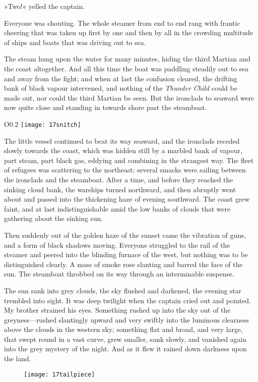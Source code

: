 »Two!« yelled the captain.

Everyone was shouting. The whole steamer from end to end rang with frantic cheering that was taken up first by one and then by all in the crowding multitude of ships and boats that was driving out to sea.

The steam hung upon the water for many minutes, hiding the third Martian and the coast altogether. And all this time the boat was paddling steadily out to sea and away from the fight; and when at last the confusion cleared, the drifting bank of black vapour intervened, and nothing of the \textit{Thunder Child} could be made out, nor could the third Martian be seen. But the ironclads to seaward were now quite close and standing in towards shore past the steamboat.

\begin{wrapfigure}{O}{0.2\textwidth}
\centering
\texttt{[image: 17snitch]}
\end{wrapfigure}

The little vessel continued to beat its way seaward, and the ironclads receded slowly towards the coast, which was hidden still by a marbled bank of vapour, part steam, part black gas, eddying and combining in the strangest way. The fleet of refugees was scattering to the northeast; several smacks were sailing between the ironclads and the steamboat. After a time, and before they reached the sinking cloud bank, the warships turned northward, and then abruptly went about and passed into the thickening haze of evening southward. The coast grew faint, and at last indistinguishable amid the low banks of clouds that were gathering about the sinking sun.



Then suddenly out of the golden haze of the sunset came the vibration of guns, and a form of black shadows moving. Everyone struggled to the rail of the steamer and peered into the blinding furnace of the west, but nothing was to be distinguished clearly. A mass of smoke rose slanting and barred the face of the sun. The steamboat throbbed on its way through an interminable suspense.

The sun sank into grey clouds, the sky flushed and darkened, the evening star trembled into sight. It was deep twilight when the captain cried out and pointed. My brother strained his eyes. Something rushed up into the sky out of the greyness—rushed slantingly upward and very swiftly into the luminous clearness above the clouds in the western sky; something flat and broad, and very large, that swept round in a vast curve, grew smaller, sank slowly, and vanished again into the grey mystery of the night. And as it flew it rained down darkness upon the land.

\begin{figure}[bh!]
\centering
\texttt{[image: 17tailpiece]}
\end{figure}
\enlargethispage{2\baselineskip}

